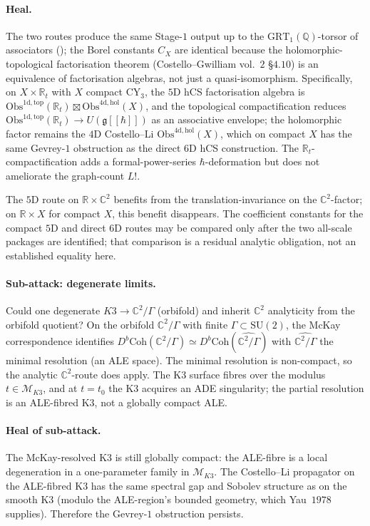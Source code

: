 \documentclass[11pt]{article}
\providecommand{\frakg}{\mathfrak{g}}
\providecommand{\Obs}{\mathrm{Obs}}
\providecommand{\C}{\mathbb{C}}
\providecommand{\R}{\mathbb{R}}
\providecommand{\Q}{\mathbb{Q}}
\providecommand{\Coh}{\mathrm{Coh}}
\providecommand{\GRT}{\mathrm{GRT}}
\theoremstyle{definition}\newtheorem{definition}[theorem]{Definition}
\theoremstyle{remark}\newtheorem{remark}[theorem]{Remark}\newtheorem{example}[theorem]{Example}
\begin{document}
\paragraph{Heal.}
The two routes produce the same Stage-$1$ output up to the
$\GRT_1(\Q)$-torsor of associators
(\cite[remark on the $\GRT_1(\Q)$-torsor of QME solutions]{cy_to_chiral}); the
Borel constants $C_X$ are identical because the holomorphic-topological
factorisation theorem (Costello--Gwilliam vol.~$2$ \S$4.10$) is an
equivalence of factorisation algebras, not just a quasi-isomorphism.
Specifically, on $X\times\R_t$ with $X$ compact CY$_3$, the $5$D hCS
factorisation algebra is
$\Obs^{1\mathrm{d,top}}(\R_t)\boxtimes\Obs^{4\mathrm{d,hol}}(X)$,
and the topological compactification reduces $\Obs^{1\mathrm{d,top}}(\R_t)
\to U(\frakg[\![\hbar]\!])$ as an associative envelope; the
holomorphic factor remains the $4$D Costello--Li $\Obs^{4\mathrm{d,hol}}(X)$,
which on compact $X$ has the same Gevrey-$1$ obstruction as the
direct $6$D hCS construction. The $\R_t$-compactification adds a
formal-power-series $\hbar$-deformation but does not ameliorate the
graph-count $L!$.

The $5$D route on $\R\times\C^2$ benefits from the translation-invariance
on the $\C^2$-factor; on $\R\times X$ for compact $X$, this benefit
disappears. The coefficient constants for the compact $5$D and direct
$6$D routes may be compared only after the two all-scale packages are
identified; that comparison is a residual analytic obligation, not an
established equality here.

\paragraph{Sub-attack: degenerate limits.}
Could one degenerate $K3\to\C^2/\Gamma$ (orbifold) and inherit $\C^2$
analyticity from the orbifold quotient? On the orbifold $\C^2/\Gamma$
with finite $\Gamma\subset\mathrm{SU}(2)$, the McKay correspondence
identifies $D^b\Coh(\C^2/\Gamma)\simeq D^b\Coh(\widehat{\C^2/\Gamma})$
with $\widehat{\C^2/\Gamma}$ the minimal resolution (an ALE space).
The minimal resolution is non-compact, so the analytic $\C^2$-route
does apply. The K3 surface fibres over the modulus $t\in\mathcal M_{K3}$,
and at $t = t_0$ the K3 acquires an ADE singularity; the partial
resolution is an ALE-fibred K3, not a globally compact ALE.

\paragraph{Heal of sub-attack.}
The McKay-resolved K3 is still globally compact: the ALE-fibre is
a local degeneration in a one-parameter family in $\mathcal M_{K3}$.
The Costello--Li propagator on the ALE-fibred K3 has the same
spectral gap and Sobolev structure as on the smooth K3 (modulo the
ALE-region's bounded geometry, which Yau~$1978$ supplies). Therefore
the Gevrey-$1$ obstruction persists.
\end{document}
